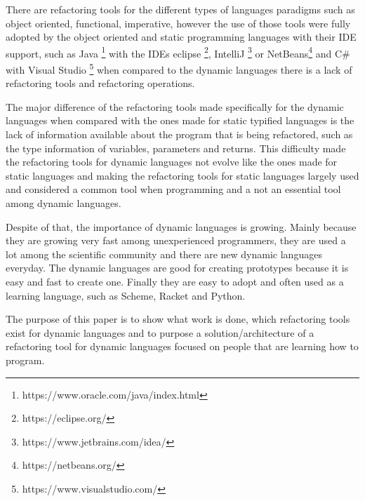There are refactoring tools for the different types of languages paradigms such as object oriented, functional, imperative, however the use of those tools were fully adopted by the object oriented and static programming languages with their IDE support, such as Java \footnote{https://www.oracle.com/java/index.html} with the IDEs eclipse \footnote{https://eclipse.org/}, IntelliJ \footnote{https://www.jetbrains.com/idea/} or NetBeans\footnote{https://netbeans.org/} and C\# with Visual Studio \footnote{https://www.visualstudio.com/} when %
compared to the dynamic languages there is a lack of refactoring tools and refactoring operations.

The major difference of the refactoring tools made specifically for the dynamic languages when compared with the ones made for static typified languages is the lack of information available about the program that is being refactored, such as the type information of variables, parameters and returns. 
This difficulty made the refactoring tools for dynamic languages not evolve like the ones made for static languages and making the refactoring tools for static languages largely used and considered a common tool when programming and a not an essential tool among dynamic languages.  %

Despite of that, the importance of dynamic languages is growing. Mainly because they are growing very fast among unexperienced programmers, they are used a lot among the scientific community and there are new dynamic languages everyday. 
The dynamic languages are good for creating prototypes because it is easy and fast to create one. Finally they are easy to adopt and often used as a learning language, such as Scheme, Racket and Python. %


The purpose of this paper is to show what work is done, which refactoring tools exist for dynamic languages and to purpose a solution/architecture of a refactoring tool for dynamic languages focused on people that are learning how to program. %







